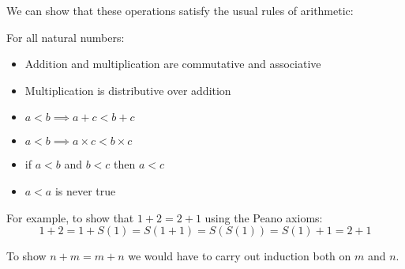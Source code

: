 \documentclass[../main.tex]{subfiles}
\begin{document}
We can show that these operations satisfy the usual rules of arithmetic:
\begin{proposition}
For all natural numbers:
  \begin{itemize}
    \item Addition and multiplication are commutative and associative
    \item Multiplication is distributive over addition
    \item $a < b \implies a + c < b + c$
    \item $a < b \implies a \times c < b \times c$
    \item if $a < b$ and $b < c$ then $a < c$
    \item $a < a$ is never true
  \end{itemize}
\end{proposition}
\begin{example}
  For example, to show that $1 + 2 = 2 + 1$ using the Peano axioms:
  \[
    1 + 2 = 1 + S(1) = S(1 + 1) = S(S(1)) = S(1) + 1 = 2 + 1
  \]
\end{example}
\begin{example}
  To show $n + m = m + n$ we would have to carry out induction both on $m$ and $n$.
\end{example}
\end{document}
